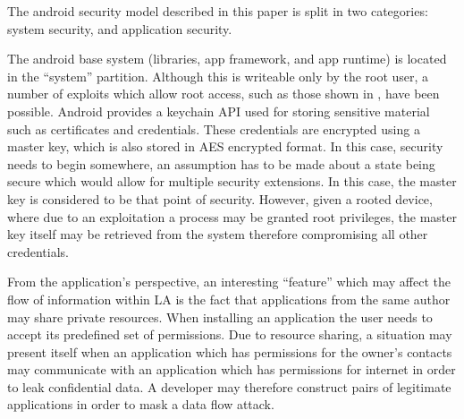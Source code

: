 The android security model described in this paper \cite{} is split in two categories: system security, and application security.

The android base system (libraries, app framework, and app runtime) is located in the ``system'' partition. Although this is writeable only by the root user, a number of exploits which allow root access, such as those shown in \cite{}, have been possible. Android provides a keychain API used for storing sensitive material such as certificates and credentials. These credentials are encrypted using a master key, which is also stored in AES encrypted format. In this case, security needs to begin somewhere, an assumption has to be made about a state being secure which would allow for multiple security extensions. In this case, the master key is considered to be that point of security. However, given a rooted device, where due to an exploitation a process may be granted root privileges, the master key itself may be retrieved from the system therefore compromising all other credentials.

From the application's perspective, an interesting ``feature'' which may affect the flow of information within LA is the fact that applications from the same author may share private resources. When installing an application the user needs to accept its predefined set of permissions. Due to resource sharing, a situation may present itself when an application which has permissions for the owner's contacts may communicate with an application which has permissions for internet in order to leak confidential data. A developer may therefore construct pairs of legitimate applications in order to mask a data flow attack.

